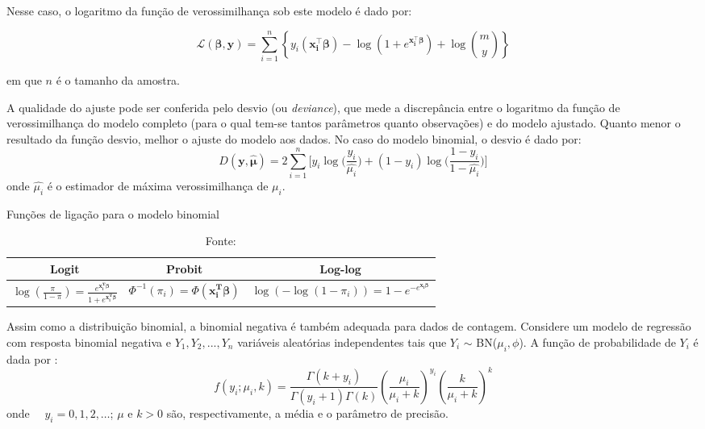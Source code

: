 \documentclass[12pt, a4paper, twoside]{report}
\numberwithin{equation}{section} %
\begin{document}
Nesse caso, o logaritmo da função de verossimilhança sob este modelo é dado por:

\begin{equation}\label{ll_binom}
\mathcal{L}(\boldsymbol{\beta},\boldsymbol{y}) = \sum\limits_{i=1}^{n}\left\{ y_i (\boldsymbol{x_i^\top \beta}) - \log{(1 + e^{\boldsymbol{x_i^\top \beta}})+\log\binom{m}{y}} \right\}
\end{equation}

em que $n$ é o tamanho da amostra.

A qualidade do ajuste pode ser conferida pelo desvio (ou \textit{deviance}), que mede a discrepância entre o logaritmo da função de verossimilhança do modelo completo (para o qual tem-se tantos parâmetros quanto observações) e do modelo ajustado. Quanto menor o resultado da função desvio, melhor o ajuste do modelo aos dados. No caso do modelo binomial, o desvio é dado por:
\begin{equation}\label{dev_binom}
D(\boldsymbol{y},\boldsymbol{\hat{\mu}})=2 \sum\limits_{i=1}^{n} \biggl[y_i \log{\biggl( \frac{y_i}{\hat{\mu_i}}} \biggl)+(1-y_i) \log \biggl( \frac{1-y_i}{1-\hat{\mu_i}} \biggl) \biggl]
\end{equation}
onde $\hat{\mu_i}$ é o estimador de máxima verossimilhança de $\mu_i$. 

\begin{table}[h]
\centering
\footnotesize
\caption{Funções de ligação para o modelo binomial}
\begin{tabular}{c|c|c} 
\hline
\textbf{Logit} & \textbf{Probit} & \textbf{Log-log}  \\ 
\hline
$\log{\left(\frac{\pi}{1-\pi}\right)}=\frac{e^{\boldsymbol{x_i^T\beta}}}{1+e^{\boldsymbol{x_i^T\beta}}}$ & $\Phi^{-1}(\pi_i)=\Phi(\boldsymbol{x_i^T\beta})$ & $\log{(-\log{(1-\pi_i)})}=1-e^{-e^{\boldsymbol{x_i\beta}}}$ \\ 
\hline
\end{tabular}
\caption*{\footnotesize Fonte: \cite{sousa2022}}
\label{tab:fligacao_binom}
\end{table}

Assim como a distribuição binomial, a binomial negativa é também adequada para dados de contagem. Considere um modelo de regressão com resposta binomial negativa e $Y_{1},Y_{2},...,Y_{n}$ variáveis aleatórias independentes tais que $Y_{i}$ $\sim$ BN($\mu_{i}, \phi$). A função de probabilidade de $Y_{i}$ é dada por \citep{paula2004modelos}:
\begin{equation}\label{fp_bn}
f(y_i; \mu_i, k) = \frac{\Gamma(k + y_i)}{\Gamma(y_i + 1) \Gamma(k)} \left( \frac{\mu_i}{\mu_i + k} \right)^{y_i} \left( \frac{k}{\mu_i + k} \right)^{k}
\end{equation}
onde $\quad y_i = 0, 1, 2, \ldots$; $\mu$ e $k>0$ são, respectivamente, a média e o parâmetro de precisão.
\end{document}
